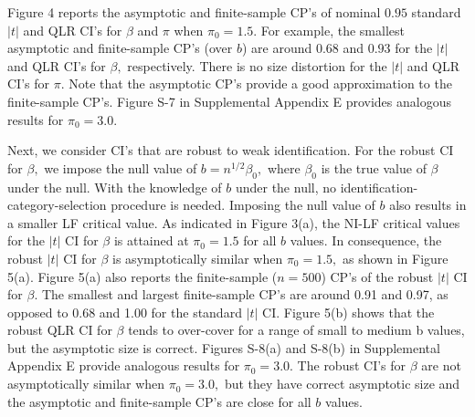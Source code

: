\documentclass[12pt,thmsb,titlepage,final,oneside,letterpaper]{article}
\begin{document}
Figure 4 reports the asymptotic and finite-sample CP's of nominal $0.95$
standard $|t|$ and QLR CI's for $\beta $ and $\pi $ when $\pi _{0}=1.5.$ For
example, the smallest asymptotic and finite-sample CP's (over $b$) are
around $0.68$ and $0.93$ for the $|t|$ and QLR CI's for $\beta ,$
respectively. There is no size distortion for the $|t|$ and QLR CI's for $%
\pi .$ Note that the asymptotic CP's provide a good approximation to the
finite-sample CP's. Figure S-7 in Supplemental Appendix E provides analogous
results for $\pi _{0}=3.0.$


Next, we consider CI's that are robust to weak identification. For the
robust CI for $\beta ,$ we impose the null value of $b=n^{1/2}\beta _{0},$
where $\beta _{0}$ is the true value of $\beta $ under the null. With the
knowledge of $b$ under the null, no identification-category-selection
procedure is needed. Imposing the null value of $b$ also results in a
smaller LF critical value. As indicated in Figure 3(a), the NI-LF critical
values for the $|t|$ CI for $\beta $ is attained at $\pi _{0}=1.5$ for all $%
b $ values. In consequence, the robust $|t|$ CI for $\beta $ is
asymptotically similar when $\pi _{0}=1.5,$ as shown in Figure 5(a). Figure
5(a) also reports the finite-sample ($n=500$) CP's of the robust $|t|$ CI
for $\beta .$ The smallest and largest finite-sample CP's are around 0.91
and 0.97, as opposed to 0.68 and 1.00 for the standard $|t|$ CI. Figure 5(b)
shows that the robust QLR CI for $\beta $ tends to over-cover for a range of
small to medium b values, but the asymptotic size is correct. Figures S-8(a)
and S-8(b) in Supplemental Appendix E provide analogous results for $\pi
_{0}=3.0.$ The robust CI's for $\beta $ are not asymptotically similar when $%
\pi _{0}=3.0,$ but they have correct asymptotic size and the asymptotic and
finite-sample CP's are close for all $b$ values.
\end{document}
